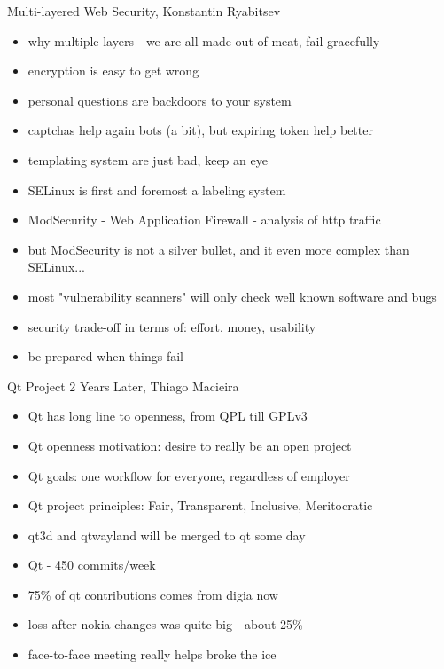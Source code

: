 \documentclass[aspectratio=169]{beamer}
\begin{document}
\begin{frame}{Multi-layered Web Security, Konstantin Ryabitsev}
  \begin{itemize}
  \item why multiple layers - we are all made out of meat, fail gracefully
  \item encryption is easy to get wrong
  \item personal questions are backdoors to your system
  \item captchas help again bots (a bit), but expiring token help better
  \item templating system are just bad, keep an eye
  \item SELinux is first and foremost a labeling system
  \item ModSecurity - Web Application Firewall - analysis of http traffic
  \item but ModSecurity is not a silver bullet, and it even more complex than SELinux...
  \item most "vulnerability scanners" will only check well known software and bugs
  \item security trade-off in terms of: effort, money, usability
  \item be prepared when things fail
  \end{itemize}
\end{frame}

\begin{frame}{Qt Project 2 Years Later, Thiago Macieira}
  \begin{itemize}
  \item Qt has long line to openness, from QPL till GPLv3
  \item Qt openness motivation: desire to really be an open project
  \item Qt goals: one workflow for everyone, regardless of employer
  \item Qt project principles: Fair, Transparent, Inclusive, Meritocratic
  \item qt3d and qtwayland will be merged to qt some day
  \item Qt - 450 commits/week
  \item 75\% of qt contributions comes from digia now
  \item loss after nokia changes was quite big - about 25\%
  \item face-to-face meeting really helps broke the ice
  \end{itemize}
\end{frame}
\end{document}
